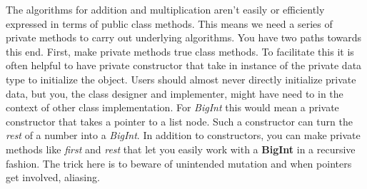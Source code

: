 \documentclass[10pt]{article}
\begin{document}
The algorithms for addition and multiplication aren't easily or efficiently expressed in terms of public class methods. This means we need a series of private methods to carry out underlying algorithms. You have two paths towards this end. First, make private methods true class methods.  To facilitate this it is often helpful to have private constructor that take in instance of the private data type to initialize the object. Users should almost never directly initialize private data, but you, the class designer and implementer, might have need to in the context of other class implementation. For \textit{BigInt} this would mean a private constructor that takes a pointer to a list node. Such a constructor can turn the \textit{rest} of a number into a \textit{BigInt}. In addition to constructors, you can make private methods like \textit{first} and \textit{rest} that let you easily work with a \textbf{BigInt} in a recursive fashion. The trick here is to beware of unintended mutation and when pointers get involved, aliasing. 
\end{document}
